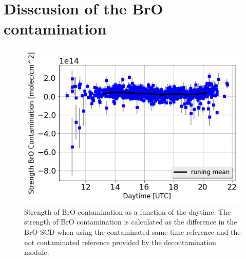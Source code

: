 \documentclass  [
  paper    = a4,
  BCOR     = 10mm,
  twoside,
  fontsize = 12pt,
  fleqn,
  toc      = bibnumbered,
  toc      = listofnumbered,
  numbers  = noendperiod,
  headings = normal,
  listof   = leveldown,
  version  = 3.03
]                                       {scrreprt}
\begin{document}
\section{Disscusion of the BrO contamination}
	\begin{figure}
		\centering
		\includegraphics[width=0.6\linewidth]{Bilder/bro_contdaytime}
		\caption{Strength of BrO contamination as a function of the daytime. The strength of BrO contamination is calculated as the difference in the BrO SCD when using the contaminated same time reference and the not contaminated reference provided by the decontamination module.}
		\label{fig:brocontdaytime}
	\end{figure}
	
\end{document}
